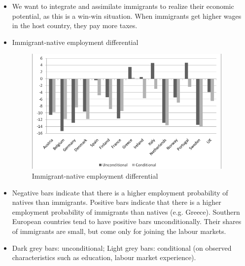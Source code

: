 \begin{itemize}
\begin{itemize}
    \item We want to integrate and assimilate immigrants to realize their economic potential, as this is a win-win situation. When immigrants get higher wages in the host country, they pay more taxes.
    \item Immigrant-native employment differential
    \begin{figure}[H]
                \centering
                \includegraphics[width=4in]{images/ch11/7.png}
                \caption{Immigrant-native employment differential}
            \end{figure}
    \item Negative bars indicate that there is a higher employment probability of natives than immigrants. Positive bars indicate that there is a higher employment probability of immigrants than natives (e.g. Greece). Southern European countries tend to have positive bars unconditionally. Their shares of immigrants are small, but come only for joining the labour markets.
    \item Dark grey bars: unconditional; Light grey bars: conditional (on observed characteristics such as education, labour market experience).
\end{itemize}



\end{itemize}
